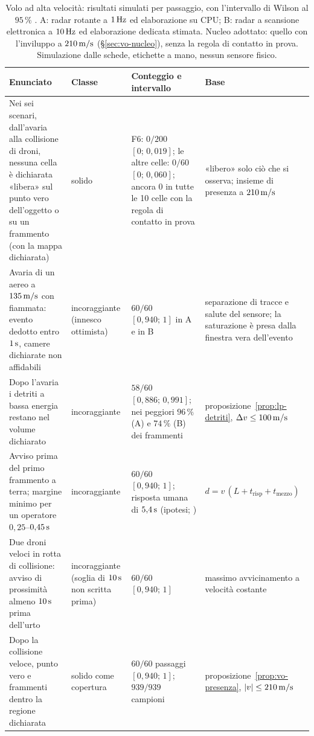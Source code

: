 \begin{table}[H]\centering\footnotesize
\caption{Volo ad alta velocità: risultati simulati per passaggio, con l'intervallo di Wilson al $95\,\%$ . A: radar rotante a $1\unita{Hz}$ ed elaborazione su CPU; B: radar a scansione elettronica a $10\unita{Hz}$ ed elaborazione dedicata stimata. Nucleo adottato: quello con l'inviluppo a $210\unita{m/s}$ (\S\ref{sec:vo-nucleo}), senza la regola di contatto in prova. Simulazione dalle schede, etichette a mano, nessun sensore fisico.}\label{tab:vo-risultati}
\begin{tabularx}{\linewidth}{@{}>{\RaggedRight\arraybackslash}p{5.0cm}>{\RaggedRight\arraybackslash}p{2.1cm}>{\RaggedRight\arraybackslash}p{4.4cm}L@{}}
\toprule
Enunciato & Classe & Conteggio e intervallo & Base\\
\midrule
Nei sei scenari, dall'avaria alla collisione di droni, nessuna cella è dichiarata «libera» sul punto vero dell'oggetto o su un frammento (con la mappa dichiarata) & solido & F6: $0/200$ $[0;\,0{,}019]$; le altre celle: $0/60$ $[0;\,0{,}060]$; ancora 0 in tutte le 10 celle con la regola di contatto in prova & «libero» solo ciò che si osserva; insieme di presenza a $210\unita{m/s}$\\
Avaria di un aereo a $135\,\mathrm{m/s}$ con fiammata: evento dedotto entro $1\,\mathrm{s}$, camere dichiarate non affidabili & incoraggiante (innesco ottimista) & $60/60$ $[0{,}940;\,1]$ in A e in B & separazione di tracce e salute del sensore; la saturazione è presa dalla finestra vera dell'evento\\
Dopo l'avaria i detriti a bassa energia restano nel volume dichiarato & incoraggiante & $58/60$ $[0{,}886;\,0{,}991]$; nei peggiori $96\,\%$ (A) e $74\,\%$ (B) dei frammenti & proposizione~\ref{prop:lp-detriti}, $\Delta v\le100\,\mathrm{m/s}$\\
Avviso prima del primo frammento a terra; margine minimo per un operatore $0{,}25$--$0{,}45\,\mathrm{s}$ & incoraggiante & $60/60$ $[0{,}940;\,1]$; risposta umana di $5{,}4\,\mathrm{s}$ (ipotesi; \cite{faa-ac-90-48e}) & $d=v\,(L+t_{\mathrm{risp}}+t_{\mathrm{mezzo}})$\\
Due droni veloci in rotta di collisione: avviso di prossimità almeno $10\,\mathrm{s}$ prima dell'urto & incoraggiante (soglia di $10\,\mathrm{s}$ non scritta prima) & $60/60$ $[0{,}940;\,1]$ & massimo avvicinamento a velocità costante\\
Dopo la collisione veloce, punto vero e frammenti dentro la regione dichiarata & solido come copertura & $60/60$ passaggi $[0{,}940;\,1]$; $939/939$ campioni & proposizione~\ref{prop:vo-presenza}, $|v|\le210\,\mathrm{m/s}$\\

\end{tabularx}
\end{table}
